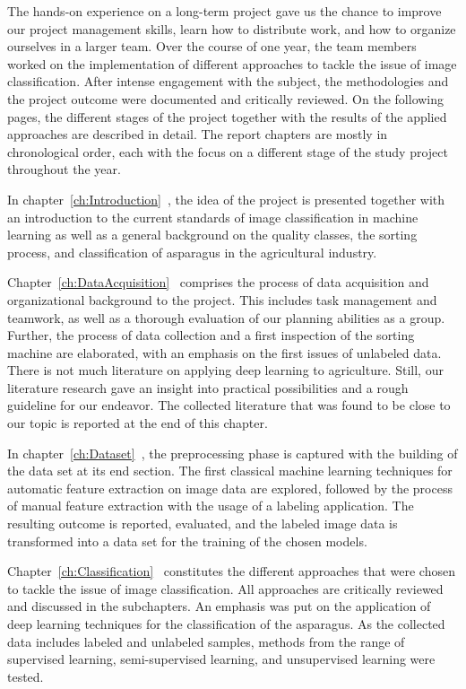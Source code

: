 The hands-on experience on a long-term project gave us the chance to improve our project management skills, learn how to distribute work, and how to organize ourselves in a larger team. Over the course of one year, the team members worked on the implementation of different approaches to tackle the issue of image classification. After intense engagement with the subject, the methodologies and the project outcome were documented and critically reviewed. On the following pages, the different stages of the project together with the results of the applied approaches are described in detail. The report chapters are mostly in chronological order, each with the focus on a different stage of the study project throughout the year.

\bigskip
In chapter~\ref{ch:Introduction}~, the idea of the project is presented together with an introduction to the current standards of image classification in machine learning as well as a general background on the quality classes, the sorting process, and classification of asparagus in the agricultural industry.

Chapter~\ref{ch:DataAcquisition}~ comprises the process of data acquisition and organizational background to the project. This includes task management and teamwork, as well as a thorough evaluation of our planning abilities as a group. Further, the process of data collection and a first inspection of the sorting machine are elaborated, with an emphasis on the first issues of unlabeled data. There is not much literature on applying deep learning to agriculture. Still, our literature research gave an insight into practical possibilities and a rough guideline for our endeavor. The collected literature that was found to be close to our topic is reported at the end of this chapter.

In chapter~\ref{ch:Dataset}~, the preprocessing phase is captured with the building of the data set at its end section. The first classical machine learning techniques for automatic feature extraction on image data are explored, followed by the process of manual feature extraction with the usage of a labeling application. The resulting outcome is reported, evaluated, and the labeled image data is transformed into a data set for the training of the chosen models.

Chapter~\ref{ch:Classification}~ constitutes the different approaches that were chosen to tackle the issue of image classification. All approaches are critically reviewed and discussed in the subchapters. An emphasis was put on the application of deep learning techniques for the classification of the asparagus. As the collected data includes labeled and unlabeled samples, methods from the range of supervised learning, semi-supervised learning, and unsupervised learning were tested.

